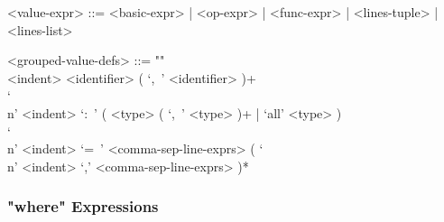 \documentclass{article}
\begin{document}
\begin{itemize}
\begin{grammar}
<value-expr> ::=
<basic-expr> | <op-expr> | <func-expr> | <lines-tuple> | <lines-list>

<grouped-value-defs> ::= ""\\
<indent> <identifier> ( `,\ ' <identifier> )+ \\
`\\n' <indent> `:\ ' ( <type> ( `,\ ' <type> )+ | `all' <type> ) \\
`\\n' <indent> `=\ '
<comma-sep-line-exprs> ( `\\n' <indent> `,' <comma-sep-line-exprs> )*
\end{grammar}

\end{itemize}

\subsubsection{"where" Expressions}
\end{document}
